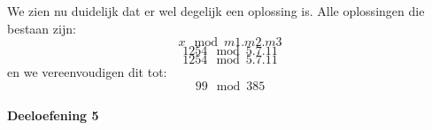 \documentclass[12pt]{article}
\begin{document}
    We zien nu duidelijk dat er wel degelijk een oplossing is.
    Alle oplossingen die bestaan zijn:
    \begin{equation}
        x \mod m1.m2.m3        
    \end{equation}
    \begin{equation}
        1254 \mod 5.7.11
    \end{equation}
    \begin{equation}
        1254 \mod 5.7.11
    \end{equation}
    en we vereenvoudigen dit tot:
    \begin{equation}
        99 \mod 385
    \end{equation}
    
    
    \paragraph{Deeloefening 5}
\end{document}
